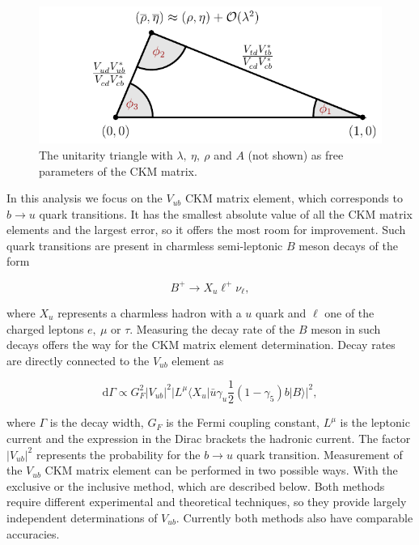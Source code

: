\documentclass[headings=standardclasses,headings=big,oneside,a4paper,openany,12pt]{scrbook}
\begin{document}
\begin{figure}[H]
\centering
\includegraphics[scale=1]{texfig/UT_Triangle}
\caption{The unitarity triangle with $\lambda,~\eta,~\rho$ and $A$ (not shown) as free parameters of the CKM matrix.}
\label{ut}
\end{figure}

In this analysis we focus on the $V_{ub}$ CKM matrix element, which corresponds to $b \rightarrow u$ quark transitions. It has the smallest absolute value of all the CKM matrix elements and the largest error, so it offers the most room for improvement. Such quark transitions are present in charmless semi-leptonic $B$ meson decays of the form

\begin{equation}
B^+ \to X_u \ell^+ \nu_\ell,
\end{equation}

where $X_u$ represents a charmless hadron with a $u$ quark and $\ell$ one of the charged leptons $e,~\mu$ or $\tau$. Measuring the decay rate of the $B$ meson in such decays offers the way for the CKM matrix element determination. Decay rates are directly connected to the $V_{ub}$ element as

\begin{equation}
\mathrm{d} \Gamma \propto G_F^2 \vert V_{ub} \vert ^2 \vert L^\mu \langle X_u \vert \bar u \gamma_u \frac{1}{2} (1-\gamma_5) b \vert B \rangle \vert ^2,
\end{equation}

where $\Gamma$ is the decay width, $G_F$ is the Fermi coupling constant, $L^\mu$ is the leptonic current and the expression in the Dirac brackets the hadronic current. The factor $\vert V_{ub} \vert ^2$ represents the probability for the $b \rightarrow u$ quark transition. Measurement of the $V_{ub}$ CKM matrix element can be performed in two possible ways. With the exclusive or the inclusive method, which are described below. Both methods require different experimental and theoretical techniques, so they provide largely independent determinations of $V_{ub}$. Currently both methods also have comparable accuracies. %
\end{document}

